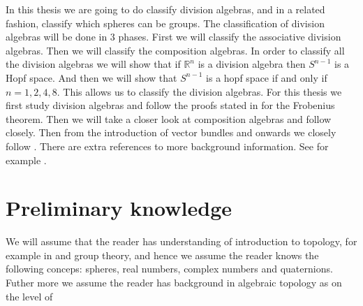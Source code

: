 \documentclass[../Thesis.tex]{subfile}
\begin{document}
In this thesis we are going to do classify division algebras, and in a related fashion, classify which spheres can be groups. The classification of division algebras will be done in 3 phases. First we will classify the associative division algebras. Then we will classify the composition algebras. In order to classify all the division algebras we will show that if $\mathbb{R}^n$ is a division algebra then $S^{n-1}$ is a Hopf space. And then we will show that $S^{n-1}$ is a hopf space if and only if $n = 1,2,4,8$. This allows us to classify the division algebras. For this thesis we first study division algebras and follow the proofs stated in \cite{Frob} for the Frobenius theorem. Then we will take a closer look at composition algebras and follow \cite{Hurwitz} closely. Then from the introduction of vector bundles and onwards we closely follow \cite{VBKT}. There are extra references to more background information. See for example \cite{Adams}.
\section{Preliminary knowledge}
We will assume that the reader has understanding of introduction to topology, for example in \cite{topo} and group theory, and hence we assume the reader knows the following conceps: spheres, real numbers, complex numbers and quaternions. Futher more we assume the reader has background in algebraic topology as on the level of \cite{AG}
\end{document}
